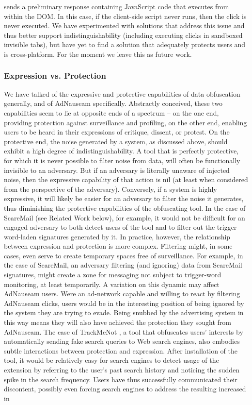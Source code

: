\documentclass[conference]{IEEEtran}
\begin{document}
sends a preliminary response containing JavaScript code that executes from within the DOM. In this case, if the client-side script never runs, then the click is never executed. We have experimented with solutions that address this issue and thus better support indistinguishability (including executing clicks in sandboxed invisible tabs), but have yet to find a solution that adequately protects users and is cross-platform. For the moment we leave this as future work.

\subsubsection{Expression vs. Protection}

We have talked of the expressive and protective capabilities of data obfuscation generally, and of AdNauseam specifically. Abstractly conceived, these two capabilities seem to lie at opposite ends of a spectrum -- on the one end, providing protection against surveillance and profiling, on the other end, enabling users to be heard in their expressions of critique, dissent, or protest. On the protective end, the noise generated by a system, as discussed above, should exhibit a high degree of indistinguishability. A tool that is perfectly protective, for which it is never possible to filter noise from data, will often be functionally invisible to an adversary. But if an adversary is literally unaware of injected noise, then the expressive capability of that action is nil (at least when considered from the perspective of the adversary). Conversely, if a system is highly expressive, it will likely be easier for an adversary to filter the noise it generates, thus diminishing the protective capabilities of the obfuscating tool. In the case of ScareMail (see Related Work below), for example, it would not be difficult for an engaged adversary to both detect users of the tool and to filter out the trigger-word-laden signatures generated by it. In practice, however, the relationship between expression and protection is more complex. Filtering might, in some cases, even serve to create temporary spaces free of surveillance. For example, in the case of ScareMail, an adversary filtering (and ignoring) data from ScareMail signatures, might create a zone for messaging not subject to trigger-word monitoring, at least temporarily. A variation on this dynamic may affect AdNauseam users. Were an ad-network capable and willing to react by filtering AdNauseam clicks, users would be in the interesting position of being ignored by the system they are trying to evade. Being snubbed by the advertising system in this way means they will also have achieved the protection they sought from AdNauseam. The case of TrackMeNot \cite{Howe-2}, a tool that obfuscates users' interests by automatically sending fake search queries to Web search engines, also embodies subtle interactions between protection and expression. After installation of the tool, it would be relatively easy for search engines to detect usage of the extension by referring to the user's past search history and noticing the sudden spike in the search frequency. Users have thus successfully communicated their discontent, possibly even forcing search engines to address the resulting increased in 
\end{document}
